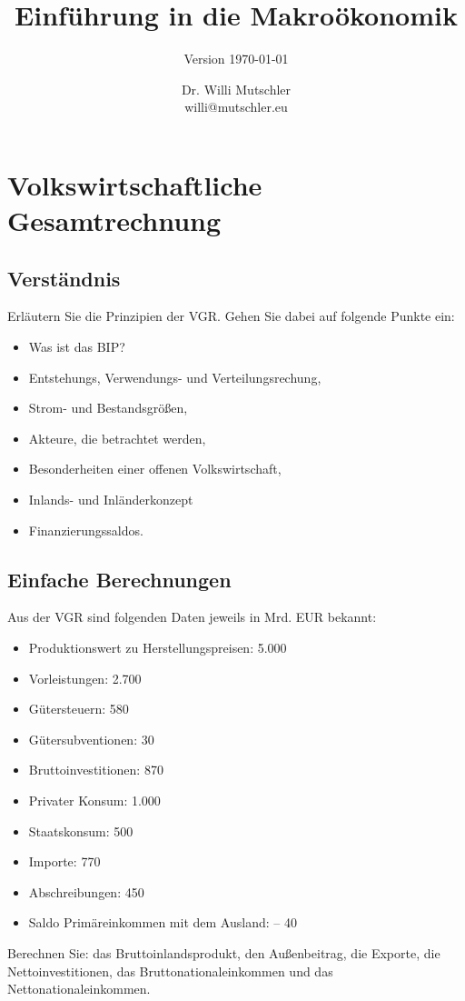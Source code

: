 \documentclass{scrartcl}
\begin{document}
\title{Einführung in die Makroökonomik}
\subtitle{Version \today}
\author{Dr. Willi Mutschler\\willi@mutschler.eu}
\date{}
\maketitle
\newpage
\tableofcontents
\newpage
\section{Volkswirtschaftliche Gesamtrechnung}
\setcounter{page}{1}
\subsection{Verst\"{a}ndnis}

Erl\"{a}utern Sie die Prinzipien der VGR. Gehen Sie dabei auf folgende Punkte ein:
\begin{itemize}
  \item Was ist das BIP?
  \item Entstehungs, Verwendungs- und Verteilungsrechung,
  \item Strom- und Bestandsgr\"{o}{\ss}en,
  \item Akteure, die betrachtet werden,
  \item Besonderheiten einer offenen Volkswirtschaft,
  \item Inlands- und Inl\"{a}nderkonzept
  \item Finanzierungssaldos.
\end{itemize}
\subsection{Einfache Berechnungen}
Aus der VGR sind folgenden Daten jeweils in Mrd. EUR bekannt:
\begin{itemize}
\item Produktionswert zu Herstellungspreisen: 5.000
\item Vorleistungen: 2.700
\item G\"{u}tersteuern: 580
\item G\"{u}tersubventionen: 30
\item Bruttoinvestitionen: 870
\item Privater Konsum: 1.000
\item Staatskonsum: 500
\item Importe: 770
\item Abschreibungen: 450
\item Saldo Primäreinkommen mit dem Ausland: – 40
\end{itemize}
Berechnen Sie: das Bruttoinlandsprodukt, den Au{\ss}enbeitrag, die Exporte, die Nettoinvestitionen, das Bruttonationaleinkommen und das Nettonationaleinkommen.
\end{document}
